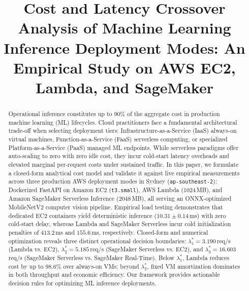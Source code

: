 \documentclass[conference]{IEEEtran}
\begin{document}
\title{Cost and Latency Crossover Analysis of Machine Learning Inference Deployment Modes: An Empirical Study on AWS EC2, Lambda, and SageMaker}

\author{
}

\maketitle

\begin{abstract}
Operational inference constitutes up to 90\% of the aggregate cost in production machine learning (ML) lifecycles. Cloud practitioners face a fundamental architectural trade-off when selecting deployment tiers: Infrastructure-as-a-Service (IaaS) always-on virtual machines, Function-as-a-Service (FaaS) serverless computing, or specialized Platform-as-a-Service (PaaS) managed ML endpoints. While serverless paradigms offer auto-scaling to zero with zero idle cost, they incur cold-start latency overheads and elevated marginal per-request costs under sustained traffic. In this paper, we formulate a closed-form analytical cost model and validate it against live empirical measurements across three production AWS deployment modes in Sydney (\texttt{ap-southeast-2}): Dockerized FastAPI on Amazon EC2 (\texttt{t3.small}), AWS Lambda (1024\,MB), and Amazon SageMaker Serverless Inference (2048\,MB), all serving an ONNX-optimized MobileNetV2 computer vision pipeline. Empirical load testing demonstrates that dedicated EC2 containers yield deterministic inference ($10.31\pm0.14$\,ms) with zero cold-start delay, whereas Lambda and SageMaker Serverless incur cold initialization penalties of $413.2$\,ms and $155.6$\,ms, respectively. Closed-form and numerical optimization reveals three distinct operational decision boundaries: $\lambda_1^* = 3.190$\,req/s (Lambda vs. EC2), $\lambda_2^* = 5.185$\,req/s (SageMaker Serverless vs. EC2), and $\lambda_3^* = 16.603$\,req/s (SageMaker Serverless vs. SageMaker Real-Time). Below $\lambda_1^*$, Lambda reduces cost by up to 98.6\% over always-on VMs; beyond $\lambda_2^*$, fixed VM amortization dominates in both throughput and economic efficiency. Our framework provides actionable decision rules for optimizing ML inference deployments.
\end{abstract}
\end{document}
